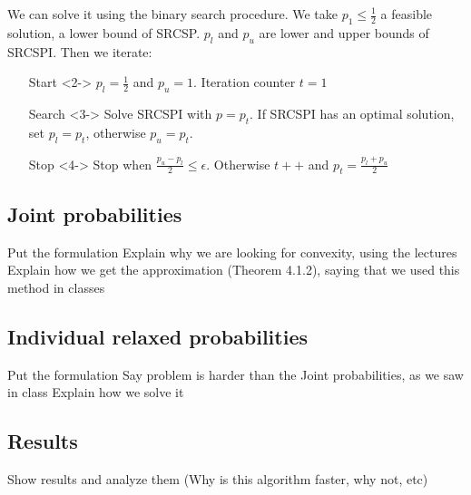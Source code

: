 \documentclass{beamer}
\begin{document}
\begin{frame}
We can solve it using the binary search procedure. We take $p_1 \leq \frac{1}{2}$ a feasible solution, a lower bound of SRCSP. $p_l$ and $p_u$ are lower and upper bounds of SRCSPI. Then we iterate:

\begin{itemize}
\item[Start]<2-> $p_l = \frac{1}{2}$ and $p_u = 1$. Iteration counter $t = 1$
\item[Search]<3-> Solve SRCSPI with $p = p_t$. If SRCSPI has an optimal solution, set $p_l = p_t$, otherwise $p_u = p_t$.
\item[Stop]<4-> Stop when $\frac{p_u - p_l}{2} \leq \epsilon$. Otherwise $t++$ and $p_t = \frac{p_l + p_u}{2} $
\end{itemize}

\end{frame}

\subsection{Joint probabilities}
\begin{frame}
Put the formulation
Explain why we are looking for convexity, using the lectures
Explain how we get the approximation (Theorem 4.1.2), saying that we used this method in classes

\end{frame}

\subsection{Individual relaxed probabilities}
\begin{frame}
Put the formulation
Say problem is harder than the Joint probabilities, as we saw in class
Explain how we solve it
\end{frame}

\subsection{Results}
\begin{frame}
Show results and analyze them (Why is this algorithm faster, why not, etc)
\end{frame}
\end{document}
